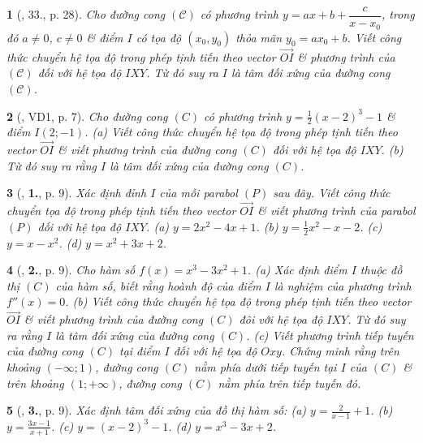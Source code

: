 \documentclass{article}
\newtheorem{baitoan}{}
\begin{document}
\begin{baitoan}[\cite{SGK_Toan_12_giai_tich_nang_cao}, 33., p. 28]
	Cho đường cong $(\mathcal{C})$ có phương trình $y = ax + b + \dfrac{c}{x - x_0}$, trong đó $a\ne0$, $c\ne0$ \& điểm $I$ có tọa độ $(x_0,y_0)$ thỏa mãn $y_0 = ax_0 + b$. Viết công thức chuyển hệ tọa độ trong phép tịnh tiến theo vector $\vec{OI}$ \& phương trình của $(\mathcal{C})$ đối với hệ tọa độ $IXY$. Từ đó suy ra $I$ là tâm đối xứng của đường cong $(\mathcal{C})$.
\end{baitoan}

\begin{baitoan}[\cite{TLCT_giai_tich_12}, VD1, p. 7]
	Cho đường cong $(C)$ có phương trình $y = \frac{1}{2}(x - 2)^3 - 1$ \& điểm $I(2;-1)$. (a) Viết công thức chuyển hệ tọa độ trong phép tịnh tiến theo vector $\overrightarrow{OI}$ \& viết phương trình của đường cong $(C)$ đối với hệ tọa độ $IXY$. (b) Từ đó suy ra rằng $I$ là tâm đối xứng của đường cong $(C)$.
\end{baitoan}

\begin{baitoan}[\cite{TLCT_giai_tich_12}, \textbf{1.}, p. 9]
	Xác định đỉnh $I$ của mỗi parabol $(P)$ sau đây. Viết công thức chuyển tọa độ trong phép tịnh tiến theo vector $\overrightarrow{OI}$ \& viết phương trình của parabol $(P)$ đối với hệ tọa độ $IXY$. (a) $y = 2x^2 - 4x + 1$. (b) $y = \frac{1}{2}x^2 - x - 2$. (c) $y = x - x^2$. (d) $y = x^2 + 3x + 2$.
\end{baitoan}

\begin{baitoan}[\cite{TLCT_giai_tich_12}, \textbf{2.}, p. 9]
	Cho hàm số $f(x) = x^3 - 3x^2 + 1$. (a) Xác định điểm $I$ thuộc đồ thị $(C)$ của hàm số, biết rằng hoành độ của điểm $I$ là nghiệm của phương trình $f''(x) = 0$. (b) Viết công thức chuyển hệ tọa độ trong phép tịnh tiến theo vector $\overrightarrow{OI}$ \& viết phương trình của đường cong $(C)$ đôi với hệ tọa độ $IXY$. Từ đó suy ra rằng $I$ là tâm đối xứng của đường cong $(C)$. (c) Viết phương trình tiếp tuyến của đường cong $(C)$ tại điểm $I$ đối với hệ tọa độ $Oxy$. Chứng minh rằng trên khoảng $(-\infty;1)$, đường cong $(C)$ nằm phía dưới tiếp tuyến tại $I$ của $(C)$ \& trên khoảng $(1;+\infty)$, đường cong $(C)$ nằm phía trên tiếp tuyến đó.
\end{baitoan}

\begin{baitoan}[\cite{TLCT_giai_tich_12}, \textbf{3.}, p. 9]
	Xác định tâm đối xứng của đồ thị hàm số: (a) $y = \frac{2}{x - 1} + 1$. (b) $y = \frac{3x - 1}{x + 1}$. (c) $y = (x - 2)^3 - 1$. (d) $y = x^3 - 3x + 2$.
\end{baitoan}
\end{document}
